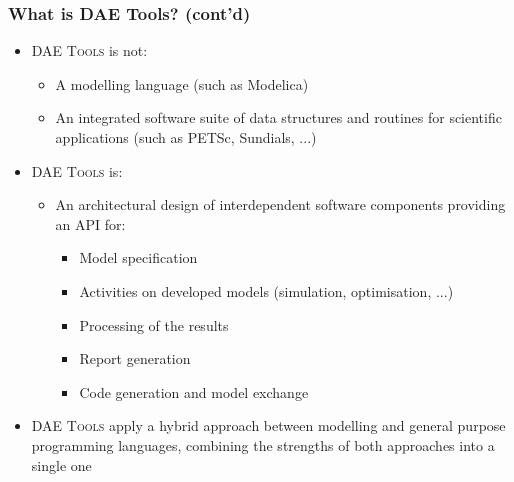 \documentclass[compress,newPxFont,sthlmFooter]{beamer}
\begin{document}
\begin{frame}
\frametitle{What is DAE Tools? (cont'd)} 
  \begin{itemize}
    \item \textsc{DAE Tools} \alert{is not}:
        \begin{itemize}
            \item A modelling language (such as Modelica)
            \item An integrated software suite of data structures and routines for scientific applications (such as PETSc, Sundials, ...)
        \end{itemize}
    \item \textsc{DAE Tools} \alert{is}:
        \begin{itemize}
            \item An \alert{architectural design of interdependent software components}
                  providing an API for:
                \begin{itemize}
                    \item \alert{Model specification}
                    \item Activities on developed models (\alert{simulation}, \alert{optimisation}, ...)
                    \item \alert{Processing of the results}
                    \item \alert{Report generation}
                    \item \alert{Code generation} and \alert{model exchange}
                \end{itemize}
        \end{itemize}
    \item \textsc{DAE Tools} apply a \alert{hybrid approach} between \alert{modelling} and \alert{general purpose} programming languages,
          \alert{combining the strengths of both approaches} into a single one
  \end{itemize}
\end{frame}
\end{document}
